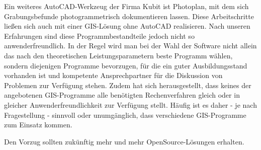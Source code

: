 Ein weiteres AutoCAD-Werkzeug der Firma Kubit ist Photoplan, mit dem sich Grabungsbefunde photogrammetrisch dokumentieren lassen. Diese Arbeitschritte ließen sich auch mit einer GIS-Lösung ohne AutoCAD realisieren. Nach unseren Erfahrungen sind diese Programmbestandteile jedoch nicht so anwenderfreundlich. In der Regel wird man bei der Wahl der Software nicht allein das nach den theoretischen Leistungsparametern beste Programm wählen, sondern diejenigen Programme bevorzugen, für die ein guter Ausbildungsstand vorhanden ist und kompetente Ansprechpartner für die Diskussion von Problemen zur Verfügung stehen. Zudem hat sich herausgestellt, dass keines der angebotenen GIS-Programme alle benötigten Rechenverfahren gleich oder in gleicher Anwenderfreundlichkeit zur Verfügung stellt. Häufig ist es daher - je nach Fragestellung - sinnvoll oder unumgänglich, dass verschiedene GIS-Programme zum Einsatz kommen.

Den Vorzug sollten zukünftig mehr und mehr OpenSource-Lösungen erhalten. 

